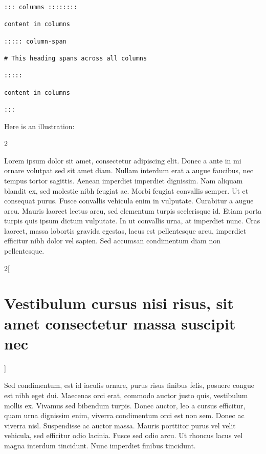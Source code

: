 \documentclass[
]{article}
\begin{document}
\begin{verbatim}
::: columns ::::::::

content in columns

::::: column-span

# This heading spans across all columns

:::::

content in columns

:::
\end{verbatim}

Here is an illustration:

{\setlength{\columnseprule}{ 1pt}
\renewcommand{\columnseprulecolor}{\color{black}}
\begin{multicols}{2}

Lorem ipsum dolor sit amet, consectetur adipiscing elit. Donec a ante in
mi ornare volutpat sed sit amet diam. Nullam interdum erat a augue
faucibus, nec tempus tortor sagittis. Aenean imperdiet imperdiet
dignissim. Nam aliquam blandit ex, sed molestie nibh feugiat ac. Morbi
feugiat convallis semper. Ut et consequat purus. Fusce convallis
vehicula enim in vulputate. Curabitur a augue arcu. Mauris laoreet
lectus arcu, sed elementum turpis scelerisque id. Etiam porta turpis
quis ipsum dictum vulputate. In ut convallis urna, at imperdiet nunc.
Cras laoreet, massa lobortis gravida egestas, lacus est pellentesque
arcu, imperdiet efficitur nibh dolor vel sapien. Sed accumsan
condimentum diam non pellentesque.

\end{multicols}
\begin{multicols}{2}[\hypertarget{vestibulum-cursus-nisi-risus-sit-amet-consectetur-massa-suscipit-nec}{%
\section{Vestibulum cursus nisi risus, sit amet consectetur massa
suscipit
nec}\label{vestibulum-cursus-nisi-risus-sit-amet-consectetur-massa-suscipit-nec}}]

Sed condimentum, est id iaculis ornare, purus risus finibus felis,
posuere congue est nibh eget dui. Maecenas orci erat, commodo auctor
justo quis, vestibulum mollis ex. Vivamus sed bibendum turpis. Donec
auctor, leo a cursus efficitur, quam urna dignissim enim, viverra
condimentum orci est non sem. Donec ac viverra nisl. Suspendisse ac
auctor massa. Mauris porttitor purus vel velit vehicula, sed efficitur
odio lacinia. Fusce sed odio arcu. Ut rhoncus lacus vel magna interdum
tincidunt. Nunc imperdiet finibus tincidunt.

\end{multicols}
}
\end{document}
